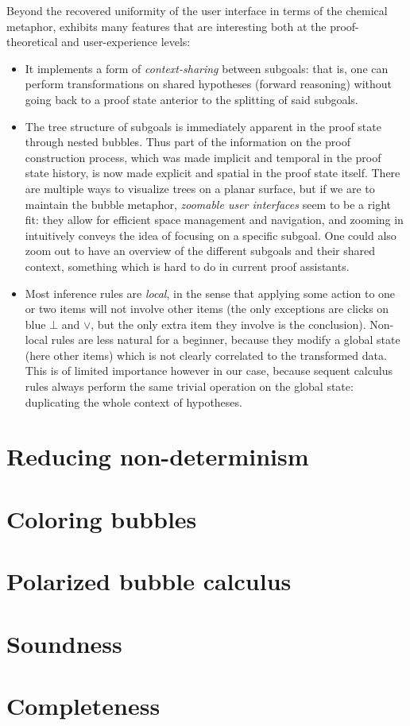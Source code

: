 Beyond the recovered uniformity of the user interface in terms of the chemical
metaphor,  exhibits many features that are interesting both at the
proof-theoretical and user-experience levels:
\begin{itemize}
  \item It implements a form of \emph{context-sharing} between subgoals: that
    is, one can perform transformations on shared hypotheses (forward reasoning)
    without going back to a proof state anterior to the splitting of said
    subgoals.
  \item The tree structure of subgoals is immediately apparent in the proof
    state through nested bubbles. Thus part of the information on the proof
    construction process, which was made implicit and temporal in the proof
    state history, is now made explicit and spatial in the proof state
    itself. There are
    multiple ways to visualize trees on a planar surface, but if we are to
    maintain the bubble metaphor, \emph{zoomable user interfaces} seem to be a
    right fit: they allow for efficient space management and navigation, and
    zooming in intuitively conveys the idea of focusing on a specific subgoal.
    One could also zoom out to have an overview of the different subgoals and
    their shared context, something which is hard to do in current proof
    assistants.
  \item Most inference rules are \emph{local}, in the sense that applying some
    action to one or two items will not involve other items (the only exceptions
    are clicks on blue $\bot$ and $\lor$, but the only extra item they involve
    is the conclusion). Non-local rules are less natural for a beginner, because
    they modify a global state (here other items) which is not clearly
    correlated to the transformed data. This is of limited importance however in
    our case, because sequent calculus rules always perform the same trivial
    operation on the global state: duplicating the whole context of hypotheses.
\end{itemize}

\section{Reducing non-determinism}

\section{Coloring bubbles}

\section{Polarized bubble calculus}

\section{Soundness}

\section{Completeness}